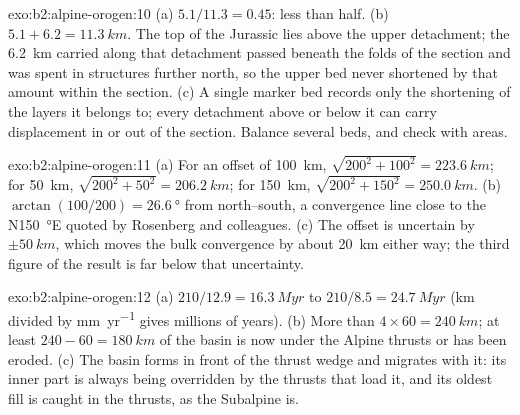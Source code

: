 \begin{solution}{exo:b2:alpine-orogen:10}
(a) $5.1/11.3 = 0.45$: less than half. (b) $5.1 + 6.2 = \qty{11.3}{km}$. The top of the
Jurassic lies above the upper detachment; the \qty{6.2}{km} carried along that detachment
passed beneath the folds of the section and was spent in structures further north, so the
upper bed never shortened by that amount within the section. (c) A single marker bed records
only the shortening of the layers it belongs to; every detachment above or below it can
carry displacement in or out of the section. Balance several beds, and check with areas.
\end{solution}

\begin{solution}{exo:b2:alpine-orogen:11}
(a) For an offset of \qty{100}{km}, $\sqrt{200^2 + 100^2} = \qty{223.6}{km}$; for
\qty{50}{km}, $\sqrt{200^2 + 50^2} = \qty{206.2}{km}$; for \qty{150}{km},
$\sqrt{200^2 + 150^2} = \qty{250.0}{km}$. (b) $\arctan(100/200) = \qty{26.6}{\degree}$ from
north--south, a convergence line close to the N\qty{150}{\degree}E quoted by Rosenberg and
colleagues. (c) The offset is uncertain by $\pm\qty{50}{km}$, which moves the bulk
convergence by about \qty{20}{km} either way; the third figure of the result is far below
that uncertainty.
\end{solution}

\begin{solution}{exo:b2:alpine-orogen:12}
(a) $210/12.9 = \qty{16.3}{Myr}$ to $210/8.5 = \qty{24.7}{Myr}$ (\unit{km} divided by
\unit{mm.yr^{-1}} gives millions of years). (b) More than $4\times60 = \qty{240}{km}$; at
least $240 - 60 = \qty{180}{km}$ of the basin is now under the Alpine thrusts or has been
eroded. (c) The basin forms in front of the thrust wedge and migrates with it: its inner
part is always being overridden by the thrusts that load it, and its oldest fill is caught
in the thrusts, as the Subalpine  is.
\end{solution}

